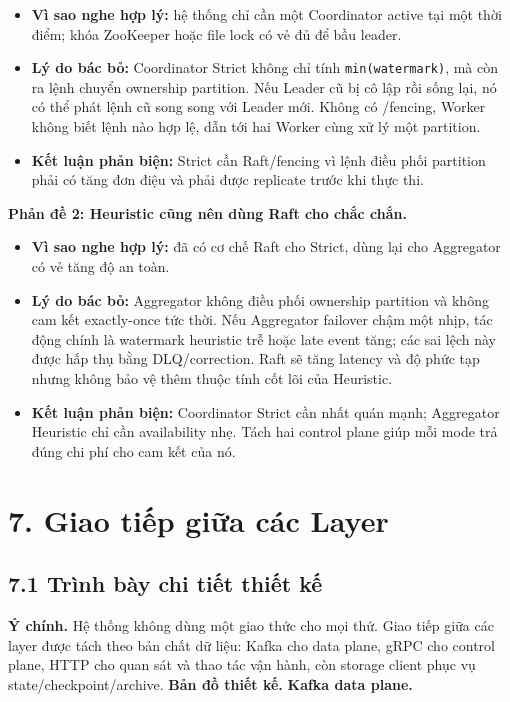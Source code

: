 \documentclass[12pt,a4paper]{article}
\begin{document}
\begin{itemize}
\item \textbf{Vì sao nghe hợp lý:} hệ thống chỉ cần một Coordinator active tại một thời điểm; khóa ZooKeeper hoặc file lock có vẻ đủ để bầu leader.
\item \textbf{Lý do bác bỏ:} Coordinator Strict không chỉ tính \texttt{min(watermark)}, mà còn ra lệnh chuyển ownership partition. Nếu Leader cũ bị cô lập rồi sống lại, nó có thể phát lệnh cũ song song với Leader mới. Không có /fencing, Worker không biết lệnh nào hợp lệ, dẫn tới hai Worker cùng xử lý một partition.
\item \textbf{Kết luận phản biện:} Strict cần Raft/fencing vì lệnh điều phối partition phải có  tăng đơn điệu và phải được replicate trước khi thực thi.
\end{itemize}
\textbf{Phản đề 2: Heuristic cũng nên dùng Raft cho chắc chắn.}

\begin{itemize}
\item \textbf{Vì sao nghe hợp lý:} đã có cơ chế Raft cho Strict, dùng lại cho Aggregator có vẻ tăng độ an toàn.
\item \textbf{Lý do bác bỏ:} Aggregator không điều phối ownership partition và không cam kết exactly-once tức thời. Nếu Aggregator failover chậm một nhịp, tác động chính là watermark heuristic trễ hoặc late event tăng; các sai lệch này được hấp thụ bằng DLQ/correction. Raft sẽ tăng latency và độ phức tạp nhưng không bảo vệ thêm thuộc tính cốt lõi của Heuristic.
\item \textbf{Kết luận phản biện:} Coordinator Strict cần nhất quán mạnh; Aggregator Heuristic chỉ cần availability nhẹ. Tách hai control plane giúp mỗi mode trả đúng chi phí cho cam kết của nó.
\end{itemize}

\section{7. Giao tiếp giữa các Layer}
\label{sec:layer-communication}

\subsection{7.1 Trình bày chi tiết thiết kế}
\textbf{Ý chính.} Hệ thống không dùng một giao thức cho mọi thứ. Giao tiếp giữa các layer được tách theo bản chất dữ liệu: Kafka cho data plane, gRPC cho control plane, HTTP cho quan sát và thao tác vận hành, còn storage client phục vụ state/checkpoint/archive.
\textbf{Bản đồ thiết kế.}
\textbf{Kafka data plane.}
\end{document}
